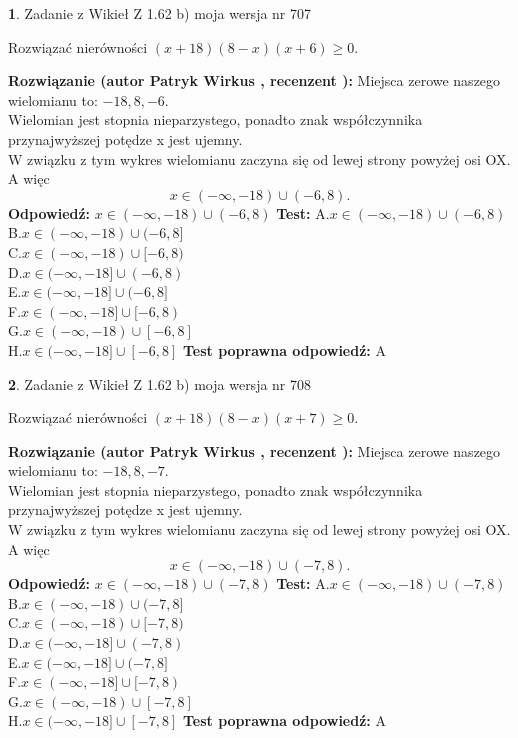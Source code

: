 \documentclass[12pt, a4paper]{article}
\theoremstyle{definition} %
\newtheorem{zad}{}
\newcommand{\zadStart}[1]{\begin{zad}#1\newline}
\newcommand{\zadStop}{\end{zad}}
\newcommand{\rozwStart}[2]{\noindent \textbf{Rozwiązanie (autor #1 , recenzent #2): }\newline}
\newcommand{\rozwStop}{\newline}
\newcommand{\odpStart}{\noindent \textbf{Odpowiedź:}\newline}
\newcommand{\odpStop}{\newline}
\newcommand{\testStart}{\noindent \textbf{Test:}\newline}
\newcommand{\testStop}{\newline}
\newcommand{\kluczStart}{\noindent \textbf{Test poprawna odpowiedź:}\newline}
\newcommand{\kluczStop}{\newline}
\begin{document}
\zadStart{Zadanie z Wikieł Z 1.62 b) moja wersja nr 707}

Rozwiązać nierówności $(x+18)(8-x)(x+6)\ge0$.
\zadStop
\rozwStart{Patryk Wirkus}{}
Miejsca zerowe naszego wielomianu to: $-18, 8, -6$.\\
Wielomian jest stopnia nieparzystego, ponadto znak współczynnika przy\linebreak najwyższej potędze x jest ujemny.\\ W związku z tym wykres wielomianu zaczyna się od lewej strony powyżej osi OX. A więc $$x \in (-\infty,-18) \cup (-6,8).$$
\rozwStop
\odpStart
$x \in (-\infty,-18) \cup (-6,8)$
\odpStop
\testStart
A.$x \in (-\infty,-18) \cup (-6,8)$\\
B.$x \in (-\infty,-18) \cup (-6,8]$\\
C.$x \in (-\infty,-18) \cup [-6,8)$\\
D.$x \in (-\infty,-18] \cup (-6,8)$\\
E.$x \in (-\infty,-18] \cup (-6,8]$\\
F.$x \in (-\infty,-18] \cup [-6,8)$\\
G.$x \in (-\infty,-18) \cup [-6,8]$\\
H.$x \in (-\infty,-18] \cup [-6,8]$
\testStop
\kluczStart
A
\kluczStop



\zadStart{Zadanie z Wikieł Z 1.62 b) moja wersja nr 708}

Rozwiązać nierówności $(x+18)(8-x)(x+7)\ge0$.
\zadStop
\rozwStart{Patryk Wirkus}{}
Miejsca zerowe naszego wielomianu to: $-18, 8, -7$.\\
Wielomian jest stopnia nieparzystego, ponadto znak współczynnika przy\linebreak najwyższej potędze x jest ujemny.\\ W związku z tym wykres wielomianu zaczyna się od lewej strony powyżej osi OX. A więc $$x \in (-\infty,-18) \cup (-7,8).$$
\rozwStop
\odpStart
$x \in (-\infty,-18) \cup (-7,8)$
\odpStop
\testStart
A.$x \in (-\infty,-18) \cup (-7,8)$\\
B.$x \in (-\infty,-18) \cup (-7,8]$\\
C.$x \in (-\infty,-18) \cup [-7,8)$\\
D.$x \in (-\infty,-18] \cup (-7,8)$\\
E.$x \in (-\infty,-18] \cup (-7,8]$\\
F.$x \in (-\infty,-18] \cup [-7,8)$\\
G.$x \in (-\infty,-18) \cup [-7,8]$\\
H.$x \in (-\infty,-18] \cup [-7,8]$
\testStop
\kluczStart
A
\kluczStop
\end{document}
